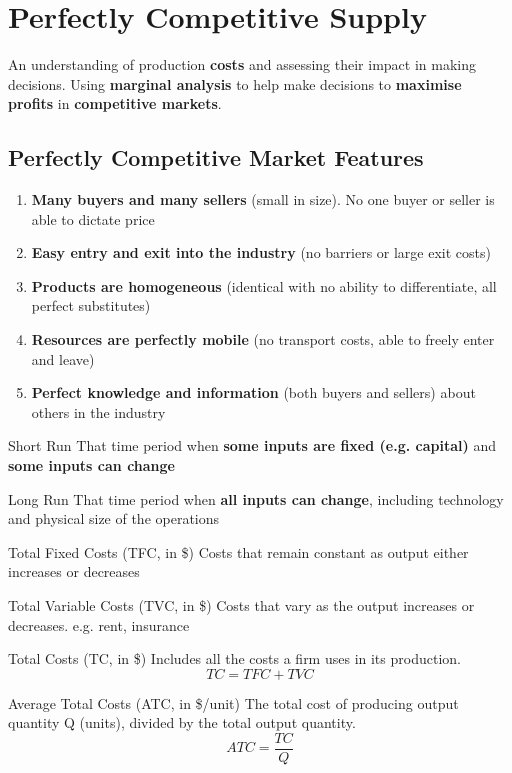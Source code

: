\section{Perfectly Competitive Supply}
An understanding of production \textbf{costs} and assessing their impact in making decisions. Using \textbf{marginal analysis} to help make decisions to \textbf{maximise profits} in \textbf{competitive markets}.
\subsection{Perfectly Competitive Market Features}
\begin{enumerate}
	\item\textbf{Many buyers and many sellers} (small in size). No one buyer or seller is able to dictate price
	\item\textbf{Easy entry and exit into the industry} (no barriers or large exit costs)
	\item\textbf{Products are homogeneous} (identical with no ability to differentiate, all perfect substitutes)
	\item\textbf{Resources are perfectly mobile} (no transport costs, able to freely enter and leave)
	\item\textbf{Perfect knowledge and information} (both buyers and sellers) about others in the industry
\end{enumerate}
\begin{note}{Short Run}
	That time period when \textbf{some inputs are fixed (e.g. capital)} and \textbf{some inputs can change}
\end{note}
\begin{note}{Long Run}
	That time period when \textbf{all inputs can change}, including technology and physical size of the operations
\end{note}
\begin{note}{Total Fixed Costs (TFC, in \$)}
	Costs that remain constant as output either increases or decreases
\end{note}
\begin{note}{Total Variable Costs (TVC, in \$)}
	Costs that vary as the output increases or decreases. e.g. rent, insurance
\end{note}
\begin{note}{Total Costs (TC, in \$)}
	Includes all the costs a firm uses in its production. $$ TC = TFC + TVC $$
\end{note}
\begin{note}{Average Total Costs (ATC, in \$/unit)}
	The total cost of producing output quantity Q (units), divided by the total output quantity. $$ ATC = \frac{TC}{Q}$$
\end{note}

